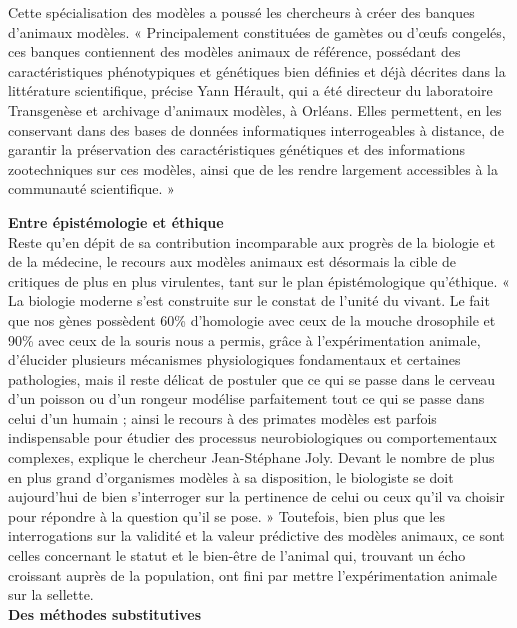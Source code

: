 \documentclass[10pt]{article}
\begin{document}
 Cette spécialisation des modèles a poussé les chercheurs à créer des banques d’animaux modèles. « Principalement constituées de gamètes ou d’œufs congelés, ces banques contiennent des modèles animaux de référence, possédant des caractéristiques phénotypiques et génétiques bien définies et déjà décrites dans la littérature scientifique, précise Yann Hérault, qui a été directeur du laboratoire Transgenèse et archivage d’animaux modèles, à Orléans. Elles permettent, en les conservant dans des bases de données informatiques interrogeables à distance, de garantir la préservation des caractéristiques génétiques et des informations zootechniques sur ces modèles, ainsi que de les rendre largement accessibles à la communauté scientifique. »
 
\textbf{ Entre épistémologie et éthique}\\
 
 Reste qu’en dépit de sa contribution incomparable aux progrès de la biologie et de la médecine, le recours aux modèles animaux est désormais la cible de critiques de plus en plus virulentes, tant sur le plan épistémologique qu’éthique. « La biologie moderne s’est construite sur le constat de l’unité du vivant. Le fait que nos gènes possèdent 60\% d’homologie avec ceux de la mouche drosophile et 90\% avec ceux de la souris nous a permis, grâce à l’expérimentation animale, d’élucider plusieurs mécanismes physiologiques fondamentaux et certaines pathologies, mais il reste délicat de postuler que ce qui se passe dans le cerveau d’un poisson ou d’un rongeur modélise parfaitement tout ce qui se passe dans celui d’un humain ; ainsi le recours à des primates modèles est parfois indispensable pour étudier des processus neurobiologiques ou comportementaux complexes, explique le chercheur Jean-Stéphane Joly. Devant le nombre de plus en plus grand d’organismes modèles à sa disposition, le biologiste se doit aujourd’hui de bien s’interroger sur la pertinence de celui ou ceux qu’il va choisir pour répondre à la question qu’il se pose. » Toutefois, bien plus que les interrogations sur la validité et la valeur prédictive des modèles animaux, ce sont celles concernant le statut et le bien-être de l’animal qui, trouvant un écho croissant auprès de la population, ont fini par mettre l’expérimentation animale sur la sellette.\\
 
\textbf{ Des méthodes substitutives}\\
 
\end{document}

